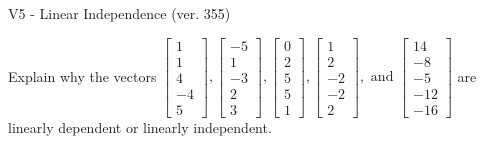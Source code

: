 \begin{exercise}
  \begin{exerciseTitle}V5 - Linear Independence (ver. 355)\end{exerciseTitle}
  \begin{exerciseStatement}
    Explain why the vectors \(\left[\begin{array}{r}
1 \\
1 \\
4 \\
-4 \\
5
\end{array}\right] , \left[\begin{array}{r}
-5 \\
1 \\
-3 \\
2 \\
3
\end{array}\right] , \left[\begin{array}{r}
0 \\
2 \\
5 \\
5 \\
1
\end{array}\right] , \left[\begin{array}{r}
1 \\
2 \\
-2 \\
-2 \\
2
\end{array}\right] , \text{ and } \left[\begin{array}{r}
14 \\
-8 \\
-5 \\
-12 \\
-16
\end{array}\right]\) are linearly dependent or linearly independent.	



\end{exerciseStatement}
\end{exercise}
